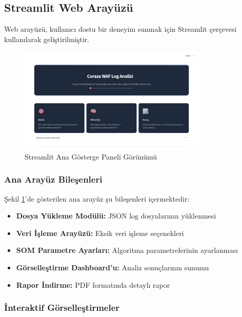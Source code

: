 \subsection{Streamlit Web Arayüzü}

Web arayüzü, kullanıcı dostu bir deneyim sunmak için Streamlit çerçevesi kullanılarak geliştirilmiştir.

\begin{figure}[!ht]
    \centering
    \includegraphics[width=0.8\textwidth]{images/streamlit-main-dashboard.png}
    \caption{Streamlit Ana Gösterge Paneli Görünümü}
    \label{fig:streamlit_main}
\end{figure}

\newpage

\subsubsection{Ana Arayüz Bileşenleri}

Şekil \ref{fig:streamlit_main}'de gösterilen ana arayüz şu bileşenleri içermektedir:

\begin{itemize}
    \item \textbf{Dosya Yükleme Modülü:} JSON log dosyalarının yüklenmesi
    \item \textbf{Veri İşleme Arayüzü:} Eksik veri işleme seçenekleri
    \item \textbf{SOM Parametre Ayarları:} Algoritma parametrelerinin ayarlanması
    \item \textbf{Görselleştirme Dashboard'u:} Analiz sonuçlarının sunumu
    \item \textbf{Rapor İndirme:} PDF formatında detaylı rapor
\end{itemize}


\subsubsection{İnteraktif Görselleştirmeler}

